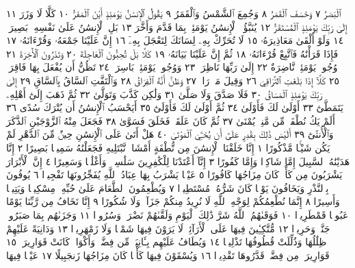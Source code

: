 ٱلْبَصَرُ ٧ وَخَسَفَ ٱلْقَمَرُ ٨ وَجُمِعَ ٱلشَّمْسُ وَٱلْقَمَرُ ٩ يَقُولُ ٱلْإِنسَٰنُ
يَوْمَئِذٍ أَيْنَ ٱلْمَفَرُّ ١٠ كَلَّا لَا وَزَرَ ١١ إِلَىٰ رَبِّكَ يَوْمَئِذٍ ٱلْمُسْتَقَرُّ ١٢ يُنَبَّؤُا۟
ٱلْإِنسَٰنُ يَوْمَئِذِۭ بِمَا قَدَّمَ وَأَخَّرَ ١٣ بَلِ ٱلْإِنسَٰنُ عَلَىٰ نَفْسِهِۦ بَصِيرَةࣱ ١٤
وَلَوْ أَلْقَىٰ مَعَاذِيرَهُۥ ١٥ لَا تُحَرِّكْ بِهِۦ لِسَانَكَ لِتَعْجَلَ بِهِۦٓ ١٦ إِنَّ عَلَيْنَا
جَمْعَهُۥ وَقُرْءَانَهُۥ ١٧ فَإِذَا قَرَأْنَٰهُ فَٱتَّبِعْ قُرْءَانَهُۥ ١٨ ثُمَّ إِنَّ عَلَيْنَا بَيَانَهُۥ ١٩
كَلَّا بَلْ تُحِبُّونَ ٱلْعَاجِلَةَ ٢٠ وَتَذَرُونَ ٱلْأٓخِرَةَ ٢١ وُجُوهࣱ يَوْمَئِذࣲ
نَّاضِرَةٌ ٢٢ إِلَىٰ رَبِّهَا نَاظِرَةࣱ ٢٣ وَوُجُوهࣱ يَوْمَئِذِۭ بَاسِرَةࣱ ٢٤ تَظُنُّ أَن يُفْعَلَ
بِهَا فَاقِرَةࣱ ٢٥ كَلَّآ إِذَا بَلَغَتِ ٱلتَّرَاقِيَ ٢٦ وَقِيلَ مَنْ͏ۜ رَاقࣲ ٢٧ وَظَنَّ أَنَّهُ
ٱلْفِرَاقُ ٢٨ وَٱلْتَفَّتِ ٱلسَّاقُ بِٱلسَّاقِ ٢٩ إِلَىٰ رَبِّكَ يَوْمَئِذٍ ٱلْمَسَاقُ ٣٠
فَلَا صَدَّقَ وَلَا صَلَّىٰ ٣١ وَلَٰكِن كَذَّبَ وَتَوَلَّىٰ ٣٢ ثُمَّ ذَهَبَ إِلَىٰٓ أَهْلِهِۦ
يَتَمَطَّىٰٓ ٣٣ أَوْلَىٰ لَكَ فَأَوْلَىٰ ٣٤ ثُمَّ أَوْلَىٰ لَكَ فَأَوْلَىٰٓ ٣٥ أَيَحْسَبُ
ٱلْإِنسَٰنُ أَن يُتْرَكَ سُدًى ٣٦ أَلَمْ يَكُ نُطْفَةࣰ مِّن مَّنِيࣲّ يُمْنَىٰ ٣٧
ثُمَّ كَانَ عَلَقَةࣰ فَخَلَقَ فَسَوَّىٰ ٣٨ فَجَعَلَ مِنْهُ ٱلزَّوْجَيْنِ ٱلذَّكَرَ
وَٱلْأُنثَىٰٓ ٣٩ أَلَيْسَ ذَٰلِكَ بِقَٰدِرٍ عَلَىٰٓ أَن يُحْـِۧيَ ٱلْمَوْتَىٰ ٤٠
هَلْ أَتَىٰ عَلَى ٱلْإِنسَٰنِ حِينࣱ مِّنَ ٱلدَّهْرِ لَمْ يَكُن شَيْـࣰٔا مَّذْكُورًا ١ إِنَّا خَلَقْنَا
ٱلْإِنسَٰنَ مِن نُّطْفَةٍ أَمْشَاجࣲ نَّبْتَلِيهِ فَجَعَلْنَٰهُ سَمِيعَۢا بَصِيرًا ٢ إِنَّا
هَدَيْنَٰهُ ٱلسَّبِيلَ إِمَّا شَاكِرࣰا وَإِمَّا كَفُورًا ٣ إِنَّآ أَعْتَدْنَا لِلْكَٰفِرِينَ سَلَٰسِلَا۟
وَأَغْلَٰلࣰا وَسَعِيرًا ٤ إِنَّ ٱلْأَبْرَارَ يَشْرَبُونَ مِن كَأْسࣲ كَانَ مِزَاجُهَا كَافُورًا ٥
عَيْنࣰا يَشْرَبُ بِهَا عِبَادُ ٱللَّهِ يُفَجِّرُونَهَا تَفْجِيرࣰا ٦ يُوفُونَ بِٱلنَّذْرِ وَيَخَافُونَ
يَوْمࣰا كَانَ شَرُّهُۥ مُسْتَطِيرࣰا ٧ وَيُطْعِمُونَ ٱلطَّعَامَ عَلَىٰ حُبِّهِۦ مِسْكِينࣰا
وَيَتِيمࣰا وَأَسِيرًا ٨ إِنَّمَا نُطْعِمُكُمْ لِوَجْهِ ٱللَّهِ لَا نُرِيدُ مِنكُمْ جَزَآءࣰ
وَلَا شُكُورًا ٩ إِنَّا نَخَافُ مِن رَّبِّنَا يَوْمًا عَبُوسࣰا قَمْطَرِيرࣰا ١٠ فَوَقَىٰهُمُ ٱللَّهُ شَرَّ
ذَٰلِكَ ٱلْيَوْمِ وَلَقَّىٰهُمْ نَضْرَةࣰ وَسُرُورࣰا ١١ وَجَزَىٰهُم بِمَا صَبَرُوا۟ جَنَّةࣰ
وَحَرِيرࣰا ١٢ مُّتَّكِـِٔينَ فِيهَا عَلَى ٱلْأَرَآئِكِۖ لَا يَرَوْنَ فِيهَا شَمْسࣰا
وَلَا زَمْهَرِيرࣰا ١٣ وَدَانِيَةً عَلَيْهِمْ ظِلَٰلُهَا وَذُلِّلَتْ قُطُوفُهَا تَذْلِيلࣰا ١٤
وَيُطَافُ عَلَيْهِم بِـَٔانِيَةࣲ مِّن فِضَّةࣲ وَأَكْوَابࣲ كَانَتْ قَوَارِيرَا۠ ١٥ قَوَارِيرَا۟ مِن فِضَّةࣲ
قَدَّرُوهَا تَقْدِيرࣰا ١٦ وَيُسْقَوْنَ فِيهَا كَأْسࣰا كَانَ مِزَاجُهَا زَنجَبِيلًا ١٧ عَيْنࣰا فِيهَا

